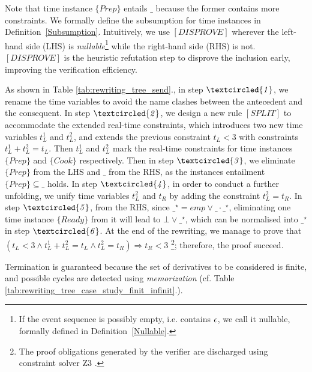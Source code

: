 \documentclass[acmsmall,10pt,review]{acmart}
\newcommand{\code}[1]{{\tt{\ensuremath{\m{#1}}}}}
\newcommand{\empt}{\textcolor{black}{\ensuremath{\epsilon}}}
\newcommand{\m}{\mathit}
\newcommand\tabref[1]{Table \textcolor{black}{\ref{#1}}.}
\newcommand\defref[1]{Definition~\textcolor{blue}{\ref{#1}}}
\begin{document}
{Note that time instance \code{\{Prep\}} entails \code{\_} because the former contains more constraints. We formally define the subsumption for time instances in \defref{Subsumption}.
Intuitively, we use \code{[DISPROVE]} wherever the left-hand side (LHS) is \emph{nullable}\footnote{If the event sequence is possibly empty, i.e. contains \code{\empt}, we call it nullable, formally defined in \defref{Nullable}.} while the right-hand side (RHS) is not. 
\code{[DISPROVE]} is the heuristic refutation step to disprove the inclusion early, improving the verification efficiency.


As shown in \tabref{tab:rewriting_tree_send}, in step \code{\textcircled{1}}, we rename the time variables to avoid the name clashes between the antecedent and the consequent.  
In step \code{\textcircled{2}}, we design a new rule \code{[SPLIT]} to accommodate the extended real-time constraints, which introduces two new time variables \code{t_L^1} and \code{t_L^2}, and 
extends the previous constraint \code{t_L {<} 3} with constraints  \code{t_L^1 {+} t_L^2 {=} t_L}. Then \code{t_L^1} and \code{t_L^2} mark the real-time constraints for time instances  \code{\{Prep\}} and \code{\{Cook\}} respectively. 
Then in step \code{\textcircled{3}}, we eliminate \code{\{Prep\}} from the LHS and \code{\_} from the RHS, as the instances entailment  \code{\{Prep\} \subseteq \_} holds.  
In step \code{\textcircled{4}}, in order to conduct a further unfolding, we unify time variables \code{t_L^2} and \code{t_R} by adding the constraint \code{t_L^2 {=} t_R}. 
In step \code{\textcircled{5}}, from the RHS, since \code{\_^\star {=} emp \vee \_ \cdot \_^\star}, eliminating one time instance \code{\{Ready\}} from it will lead to \code{\bot \vee \_^\star}, which can be normalised into \code{\_^\star} in step \code{\textcircled{6}}.
At the end of the rewriting, we manage to prove that \code{(t_L {<}3 {\wedge} t_L^1 {+} t_L^2 {=}t_L {\wedge}t_L^2 {=} t_R)  \Rightarrow  t_R {<} 3} \footnote{The proof obligations generated by the verifier are discharged using constraint solver Z3 \cite{de2008z3}.}; therefore, the proof succeed.

Termination is guaranteed because the set of derivatives to be considered is finite, and possible cycles are detected using \emph{memorization} \cite{brotherston2005cyclic} (cf. \tabref{tab:rewriting_tree_case_study_finit_infinit}). 



}
\end{document}
